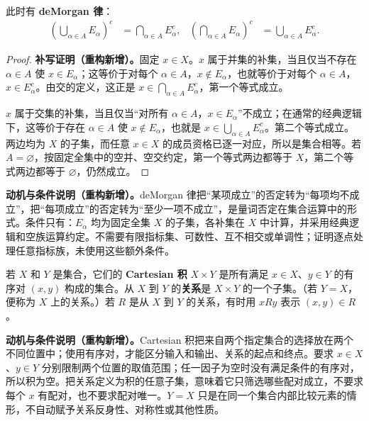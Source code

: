 \documentclass[../../main.tex]{subfiles}%
\begin{document}
\begin{proposition}[deMorgan 律]\label{proposition:ch00-demorgan-laws}
此时有 \textbf{deMorgan 律}：
\begin{align*}
\left(\bigcup_{\alpha\in A}E_\alpha\right)^c&=\bigcap_{\alpha\in A}E_\alpha^c,
&\left(\bigcap_{\alpha\in A}E_\alpha\right)^c&=\bigcup_{\alpha\in A}E_\alpha^c.
\end{align*}
\end{proposition}
\begin{proof}
\textbf{补写证明（重构新增）。}固定 $x\in X$。$x$ 属于并集的补集，当且仅当不存在 $\alpha\in A$ 使 $x\in E_\alpha$；这等价于对每个 $\alpha\in A$，$x\notin E_\alpha$，也就等价于对每个 $\alpha\in A$，$x\in E_\alpha^c$。由交的定义，这正是 $x\in\bigcap_{\alpha\in A}E_\alpha^c$，第一个等式成立。

$x$ 属于交集的补集，当且仅当“对所有 $\alpha\in A$，$x\in E_\alpha$”不成立；在通常的经典逻辑下，这等价于存在 $\alpha\in A$ 使 $x\notin E_\alpha$，也就是 $x\in\bigcup_{\alpha\in A}E_\alpha^c$。第二个等式成立。两边均为 $X$ 的子集，而任意 $x\in X$ 的成员资格已逐一对应，所以是集合相等。若 $A=\varnothing$，按固定全集中的空并、空交约定，第一个等式两边都等于 $X$，第二个等式两边都等于 $\varnothing$，仍然成立。
\end{proof}
\begin{remark}
\textbf{动机与条件说明（重构新增）。}deMorgan 律把“某项成立”的否定转为“每项均不成立”，把“每项成立”的否定转为“至少一项不成立”，是量词否定在集合运算中的形式。条件只有：$E_\alpha$ 均为固定全集 $X$ 的子集，各补集在 $X$ 中计算，并采用经典逻辑和空族运算约定。不需要有限指标集、可数性、互不相交或单调性；证明逐点处理任意指标族，未使用这些额外条件。
\end{remark}



\begin{definition}\label{definition:ch00-products-relations}
若 $X$ 和 $Y$ 是集合，它们的 \textbf{Cartesian 积} $X\times Y$ 是所有满足 $x\in X$、$y\in Y$ 的有序对 $(x,y)$ 构成的集合。从 $X$ 到 $Y$ 的\textbf{关系}是 $X\times Y$ 的一个子集。（若 $Y=X$，便称为 $X$ 上的关系。）若 $R$ 是从 $X$ 到 $Y$ 的关系，有时用 $xRy$ 表示 $(x,y)\in R$。
\end{definition}
\begin{remark}
\textbf{动机与条件说明（重构新增）。}Cartesian 积把来自两个指定集合的选择放在两个不同位置中；使用有序对，才能区分输入和输出、关系的起点和终点。要求 $x\in X$、$y\in Y$ 分别限制两个位置的取值范围；任一因子为空时没有满足条件的有序对，所以积为空。把关系定义为积的任意子集，意味着它只筛选哪些配对成立，不要求每个 $x$ 有配对，也不要求配对唯一。$Y=X$ 只是在同一个集合内部比较元素的情形，不自动赋予关系反身性、对称性或其他性质。
\end{remark}
\end{document}
